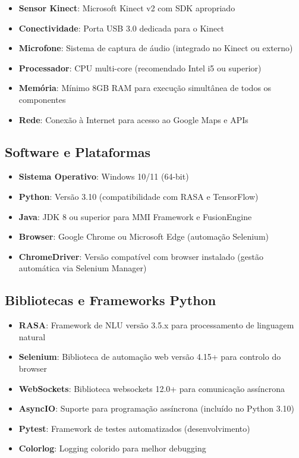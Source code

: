 \begin{itemize}
    \item \textbf{Sensor Kinect}: Microsoft Kinect v2 com SDK apropriado
    \item \textbf{Conectividade}: Porta USB 3.0 dedicada para o Kinect
    \item \textbf{Microfone}: Sistema de captura de áudio (integrado no Kinect ou externo)
    \item \textbf{Processador}: CPU multi-core (recomendado Intel i5 ou superior)
    \item \textbf{Memória}: Mínimo 8GB RAM para execução simultânea de todos os componentes
    \item \textbf{Rede}: Conexão à Internet para acesso ao Google Maps e APIs
\end{itemize}

\subsection{Software e Plataformas}

\begin{itemize}
    \item \textbf{Sistema Operativo}: Windows 10/11 (64-bit)
    \item \textbf{Python}: Versão 3.10 (compatibilidade com RASA e TensorFlow)
    \item \textbf{Java}: JDK 8 ou superior para MMI Framework e FusionEngine
    \item \textbf{Browser}: Google Chrome ou Microsoft Edge (automação Selenium)
    \item \textbf{ChromeDriver}: Versão compatível com browser instalado (gestão automática via Selenium Manager)
\end{itemize}

\subsection{Bibliotecas e Frameworks Python}

\begin{itemize}
    \item \textbf{RASA}: Framework de NLU versão 3.5.x para processamento de linguagem natural
    \item \textbf{Selenium}: Biblioteca de automação web versão 4.15+ para controlo do browser
    \item \textbf{WebSockets}: Biblioteca websockets 12.0+ para comunicação assíncrona
    \item \textbf{AsyncIO}: Suporte para programação assíncrona (incluído no Python 3.10)
    \item \textbf{Pytest}: Framework de testes automatizados (desenvolvimento)
    \item \textbf{Colorlog}: Logging colorido para melhor debugging
\end{itemize}

